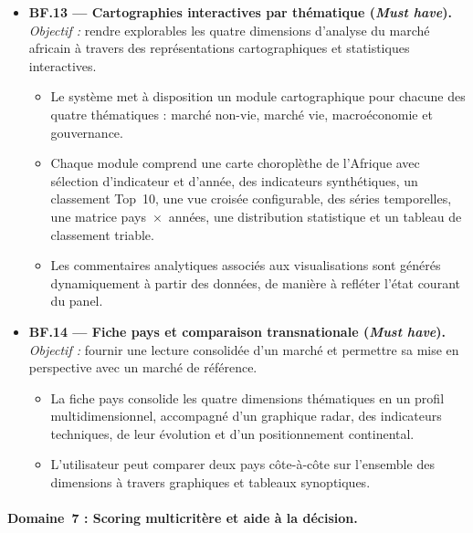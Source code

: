 \documentclass[../main.tex]{subfiles}
\begin{document}
\begin{itemize}[leftmargin=1.5cm, itemsep=6pt]

  \item \textbf{BF.13 --- Cartographies interactives par thématique (\textit{Must have}).}
  \emph{Objectif :} rendre explorables les quatre dimensions d'analyse du marché africain à travers des représentations cartographiques et statistiques interactives.
  \begin{itemize}[label=\textendash, itemsep=2pt]
    \item Le système met à disposition un module cartographique pour chacune des quatre thématiques : marché non-vie, marché vie, macroéconomie et gouvernance.
    \item Chaque module comprend une carte choroplèthe de l'Afrique avec sélection d'indicateur et d'année, des indicateurs synthétiques, un classement Top~10, une vue croisée configurable, des séries temporelles, une matrice pays~$\times$~années, une distribution statistique et un tableau de classement triable.
    \item Les commentaires analytiques associés aux visualisations sont générés dynamiquement à partir des données, de manière à refléter l'état courant du panel.
  \end{itemize}

  \item \textbf{BF.14 --- Fiche pays et comparaison transnationale (\textit{Must have}).}
  \emph{Objectif :} fournir une lecture consolidée d'un marché et permettre sa mise en perspective avec un marché de référence.
  \begin{itemize}[label=\textendash, itemsep=2pt]
    \item La fiche pays consolide les quatre dimensions thématiques en un profil multidimensionnel, accompagné d'un graphique radar, des indicateurs techniques, de leur évolution et d'un positionnement continental.
    \item L'utilisateur peut comparer deux pays côte-à-côte sur l'ensemble des dimensions à travers graphiques et tableaux synoptiques.
  \end{itemize}

\end{itemize}

\paragraph{Domaine~7 : Scoring multicritère et aide à la décision.}
\end{document}
